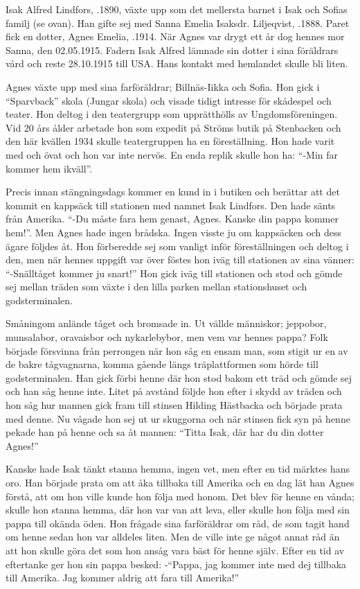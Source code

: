 Isak Alfred Lindfors, .1890,  växte upp som det mellersta barnet i Isak och Sofias familj (se ovan). Han gifte sej med Sanna Emelia Isaksdr. Liljeqvist, .1888. Paret fick en dotter, Agnes Emelia, .1914. När Agnes var drygt ett år dog hennes mor Sanna, den 02.05.1915. Fadern Isak Alfred lämnade sin dotter i sina föräldrars vård och reste 28.10.1915 till USA. Hans kontakt med hemlandet skulle bli liten.

Agnes växte upp med sina farföräldrar; Billnäs-Iikka och Sofia. Hon gick i ``Sparvback'' skola (Jungar skola) och visade tidigt intresse för skådespel och teater. Hon deltog i den teatergrupp som upprätthölls av Ungdomsföreningen. Vid 20 års ålder arbetade hon som expedit på Ströms butik på Stenbacken och den här kvällen 1934 skulle teatergruppen ha en föreställning. Hon hade varit med och övat och hon var inte nervös. En enda replik skulle hon ha: ``-Min far kommer hem ikväll''.

Precis innan stängningsdags kommer en kund in i butiken och berättar att det kommit en kappsäck till stationen med namnet Isak Lindfors. Den hade sänts från Amerika. ``-Du måste fara hem genast, Agnes. Kanske din pappa kommer hem!''.  Men Agnes hade ingen brådska. Ingen visste ju om kappsäcken och dess ägare följdes åt. Hon förberedde sej som vanligt inför föreställningen och deltog i den, men när hennes uppgift var över föstes hon iväg till stationen av sina vänner: ``-Snälltåget kommer ju snart!'' Hon gick iväg till stationen och stod och gömde sej mellan träden som växte i den lilla parken mellan stationshuset och godsterminalen.

Småningom anlände tåget och bromsade in. Ut vällde människor; jeppobor, munsalabor, oravaisbor och nykarlebybor, men vem var hennes pappa? Folk började försvinna från perrongen när hon såg en ensam man, som stigit ur en av de bakre tågvagnarna, komma gående längs träplattformen som hörde till godsterminalen. Han gick förbi henne där hon stod bakom ett träd och gömde sej och han såg henne inte. Litet på avstånd följde hon efter i skydd av träden och hon såg hur mannen gick fram till stinsen Hilding Hästbacka och började prata med denne. Nu vågade hon sej ut ur skuggorna och när stinsen fick syn på henne pekade han på henne och sa åt mannen: ``Titta Isak, där har du din dotter Agnes!''

Kanske hade Isak tänkt stanna hemma, ingen vet, men efter en tid märktes hans oro. Han började prata om att åka tillbaka till Amerika och en dag lät han Agnes förstå, att om hon ville kunde hon följa med honom. Det blev för henne en vånda; skulle hon stanna hemma, där hon var van att leva, eller skulle hon följa med sin pappa till okända öden. Hon frågade sina farföräldrar om råd, de som tagit hand om henne sedan hon var alldeles liten. Men de ville inte ge något annat råd än att hon skulle göra det som hon  ansåg vara bäst för henne själv. Efter en tid av eftertanke ger hon sin pappa besked: -``Pappa, jag kommer inte med dej tillbaka till Amerika. Jag kommer aldrig att fara till Amerika!''

